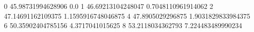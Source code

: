 0 45.98731994628906 0.0
1 46.69213104248047 0.7048110961914062
2 47.14691162109375 1.1595916748046875
4 47.8905029296875 1.9031829833984375
6 50.35902404785156 4.3717041015625
8 53.2118034362793 7.224483489990234
